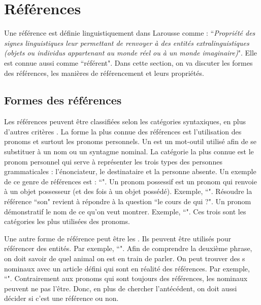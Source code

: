 \documentclass{KodeBook}
\begin{document}
\section{Références}

Une référence est définie linguistiquement dans Larousse comme : ``\textit{Propriété des signes linguistiques leur permettant de renvoyer à des entités extralinguistiques (objets ou individus appartenant au monde réel ou à un monde imaginaire)}". 
Elle est connue aussi comme ``référent".
Dans cette section, on va discuter les formes des références, les manières de référencement et leurs propriétés.

\subsection{Formes des références}

Les références peuvent être classifiées selon les catégories syntaxiques, en plus d'autres critères \cite{2015-schmolz}.
La forme la plus connue des références est l'utilisation des pronoms et surtout les pronoms personnels.
Un  est un mot-outil utilisé afin de se substituer à un nom ou un syntagme nominal. 
La catégorie la plus connue est le pronom personnel qui serve à représenter les trois types des personnes grammaticales : l'énonciateur, le destinataire et la personne absente. 
Un exemple de ce genre de références est :  ``".
Un pronom possessif est un pronom qui renvoie à un objet possesseur (et des fois à un objet possédé).
Exemple, ``".
Résoudre la référence ``son" revient à répondre à la question ``le cours de qui ?". 
Un pronom démonstratif le nom de ce qu'on veut montrer.
Exemple, ``". 
Ces trois sont les catégories les plus utilisées des pronoms.

Une autre forme de référence peut être les .
Ils peuvent être utilisés pour référencer des entités.
Par exemple, ``".
Afin de comprendre la deuxième phrase, on doit savoir de quel animal on est en train de parler. 
On peut trouver des s nominaux avec un article défini qui sont en réalité des références. 
Par exemple, ``".
Contrairement aux pronoms qui sont toujours des références, les  nominaux peuvent ne pas l'être. 
Donc, en plus de chercher l'antécédent, on doit aussi décider si c'est une référence ou non.
\end{document}
